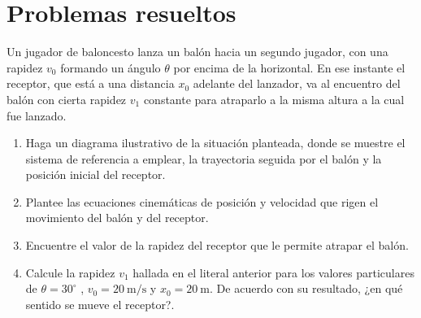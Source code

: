 \section{Problemas resueltos}

\ejercicio{}
\begin{frame}
  Un jugador de baloncesto lanza un balón hacia un segundo
jugador, con una rapidez $v_0$ formando un ángulo $\theta$ por
encima de la horizontal. 
En ese instante el receptor, que está a una distancia $x_0$ adelante
del lanzador, va al encuentro del balón con cierta rapidez $v_1$
constante para atraparlo a la misma altura a la cual fue lanzado.
\begin{enumerate}
\item Haga un diagrama ilustrativo de la situación planteada, donde se muestre el sistema de referencia a emplear, la trayectoria seguida por el balón y la posición inicial del receptor.
  \label{item:1jug}
\item Plantee las ecuaciones cinemáticas de posición y velocidad que rigen el movimiento del balón y del receptor.
  \label{item:2jug}
\item Encuentre el valor de la rapidez del receptor que le permite atrapar el balón. 
  \label{item:3jug}
\item Calcule la rapidez $v_1$ hallada en el literal anterior para los valores particulares de $\theta=30^\circ$ , $v_0=\SI{20}{\meter\per\second}$  y $x_0=\SI{20}{\meter}$. De acuerdo con su resultado, ¿en qué sentido se mueve el receptor?.
  \label{item:4jug}
\end{enumerate}
\end{frame}


